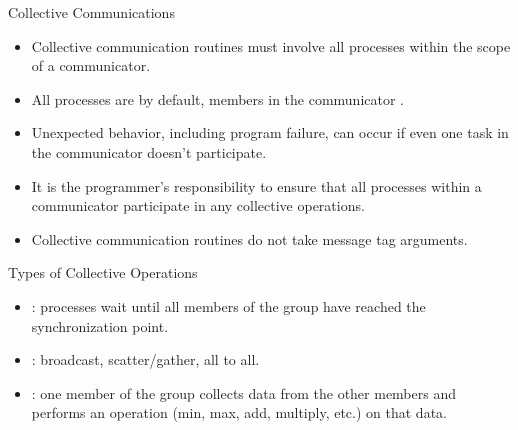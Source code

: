 \documentclass[10pt,t]{beamer}
\begin{document}
\begin{frame}{Collective Communications}
  \begin{itemize}
    \item Collective communication routines must involve all processes within the scope of a communicator. 
    \item All processes are by default, members in the communicator .
    \item Unexpected behavior, including program failure, can occur if even one task in the communicator doesn’t participate.
    \item It is the programmer’s responsibility to ensure that all processes within a communicator participate in any collective operations.
    \item Collective communication routines do not take message tag arguments.
  \end{itemize}
  
  \begin{block}{Types of Collective Operations}
    \begin{itemize}
      \item {}: processes wait until all members of the group have reached the synchronization point.
      \item {}: broadcast, scatter/gather, all to all.
      \item {}: one member of the group collects data from the other members and performs an operation (min, max, add, multiply, etc.) on that data.
    \end{itemize}
  \end{block}
\end{frame}
\end{document}

